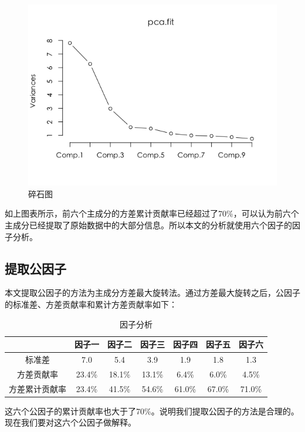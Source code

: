 \documentclass[12pt,a4paper,onecolumn]{article}
\begin{document}
\begin{figure}[H]
\centering
\includegraphics[width=400pt]{碎石图.png}
\caption{\small{碎石图}}
\end{figure}

如上图表所示，前六个主成分的方差累计贡献率已经超过了70\%，可以认为前六个主成分已经提取了原始数据中的大部分信息。所以本文的分析就使用六个因子的因子分析。

\subsection{提取公因子}

本文提取公因子的方法为主成分方差最大旋转法。通过方差最大旋转之后，公因子的标准差、方差贡献率和累计方差贡献率如下：

\begin{table}[H]
\centering
\caption{因子分析}
\begin{tabular}{ccccccc}
  \hline
     & 因子一 & 因子二 & 因子三 & 因子四 & 因子五 & 因子六 \\\hline
    标准差 & 7.0 & 5.4 & 3.9 & 1.9 & 1.8 & 1.3 \\
    方差贡献率 & 23.4\% & 18.1\% & 13.1\% & 6.4\% & 6.0\% & 4.5\% \\
    方差累计贡献率 & 23.4\% & 41.5\% & 54.6\% & 61.0\% & 67.0\% & 71.0\% \\
    \hline
  \end{tabular}
\end{table}

这六个公因子的累计贡献率也大于了70\%。说明我们提取公因子的方法是合理的。现在我们要对这六个公因子做解释。
\end{document}
